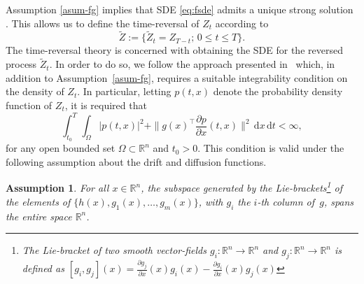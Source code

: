 \documentclass[letterpaper, 10 pt, conference]{ieeeconf}  %
\def\Re{\mathbb{R}}
\def\R{\mathbb{R}}
\newcommand{\field}[1]{\mathbb{#1}}
\def\Re{\field{R}}
\def\R{\mathbb{R}}
\newtheorem{assumption}{Assumption}
\newcommand{\ud}{\,\mathrm{d}}
\def\Re{\mathbb{R}}
\renewcommand{\Re}{\mathbb{R}}
\begin{document}
Assumption \ref{asum-fg} implies that SDE \eqref{eq:fsde} admits a unique strong solution \cite[Thm. 5.2.1.]{oksendal2003stochastic}. This allows us to define the time-reversal of $Z_t$ according to 
\begin{equation*}
    \tilde{Z} \mathrel{:=} \{\tilde{Z}_t =Z_{T-t} ;\, 0 \leq t \leq T\}. 
\end{equation*} 
The time-reversal theory is concerned with obtaining the SDE for the reversed process $\tilde Z_t$. In order to do so, we follow the approach presented in~\cite{haussmann1986time} which, in addition to Assumption~\ref{asum-fg}, requires a suitable integrability condition on the density of $Z_t$. In particular, letting $p(t,x)$ denote the probability density function of $Z_t$, it is required that 
    \begin{equation}\label{eq:asum-bound}
        \int_{t_0}^T \int_\Omega |p(t,x)|^2 + \|g(x)^\top \frac{\partial p}{\partial x} (t,x)\|^2 \ud x \ud t < \infty ,
    \end{equation}
    for any open bounded set $\Omega \subset \Re^n$  and $t_0>0$.
This condition is valid under  the following assumption about the drift and diffusion functions. 


\begin{assumption}\label{asum-brackets}
    For all $x\in \R^n$, the subspace generated by the Lie-brackets\footnote{The Lie-bracket of two smooth vector-fields $g_i:\R^n \to \R^n$ and $g_j:\R^n\to \R^n$ is defined as $[g_i,g_j](x)=\frac{\partial g_j}{\partial x}(x)g_i(x) - \frac{\partial g_i}{\partial x}(x)g_j(x)$} of the elements of $\{h(x),g_1(x),\ldots,g_m(x)\}$, with $g_i$ the $i$-th column of~$g$, spans the entire space $\R^n$. 
\end{assumption}
\end{document}
